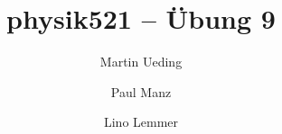 

\hypersetup{
	pdftitle=
}

\title{physik521 -- Übung 9}
\author{
	Martin Ueding 
        \and
        Paul Manz
        \and
        Lino Lemmer
}



\maketitle


\IfFileExists{\bibliographyfile}{
    \printbibliography
}{}



